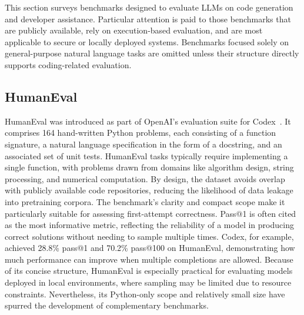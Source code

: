 This section surveys benchmarks designed to evaluate \glspl{LLM} on code generation and developer assistance. Particular attention is paid to those benchmarks that are publicly available, rely on execution-based evaluation, and are most applicable to secure or locally deployed systems. Benchmarks focused solely on general-purpose natural language tasks are omitted unless their structure directly supports coding-related evaluation.

\subsection{HumanEval}
HumanEval was introduced as part of OpenAI's evaluation suite for Codex~\autocite{Chen2021}. It comprises 164 hand-written Python problems, each consisting of a function signature, a natural language specification in the form of a docstring, and an associated set of unit tests. HumanEval tasks typically require implementing a single function, with problems drawn from domains like algorithm design, string processing, and numerical computation. By design, the dataset avoids overlap with publicly available code repositories, reducing the likelihood of data leakage into pretraining corpora. The benchmark’s clarity and compact scope make it particularly suitable for assessing first-attempt correctness. Pass@1 is often cited as the most informative metric, reflecting the reliability of a model in producing correct solutions without needing to sample multiple times. Codex, for example, achieved 28.8\% pass@1 and 70.2\% pass@100 on HumanEval, demonstrating how much performance can improve when multiple completions are allowed. Because of its concise structure, HumanEval is especially practical for evaluating models deployed in local environments, where sampling may be limited due to resource constraints. Nevertheless, its Python-only scope and relatively small size have spurred the development of complementary benchmarks.

